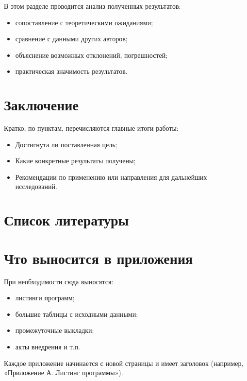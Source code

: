 \documentclass[
  english,
  russian,
  12pt,
  a4paper,
  DIV=11,
  numbers=noendperiod]{scrreprt}
\newcounter{none} %
\providecommand{\tightlist}{%
  \setlength{\itemsep}{0pt}\setlength{\parskip}{0pt}}
\begin{document}
В этом разделе проводится анализ полученных результатов:

\begin{itemize}
\tightlist
\item
  сопоставление с теоретическими ожиданиями;
\item
  сравнение с данными других авторов;
\item
  объяснение возможных отклонений, погрешностей;
\item
  практическая значимость результатов.
\end{itemize}

\chapter{Заключение}\label{ux437ux430ux43aux43bux44eux447ux435ux43dux438ux435}

Кратко, по пунктам, перечисляются главные итоги работы:

\begin{itemize}
\tightlist
\item
  Достигнута ли поставленная цель;
\item
  Какие конкретные результаты получены;
\item
  Рекомендации по применению или направления для дальнейших
  исследований.
\end{itemize}

\chapter*{Список
литературы}\label{ux441ux43fux438ux441ux43eux43a-ux43bux438ux442ux435ux440ux430ux442ux443ux440ux44b}

\printbibliography[heading=none]

\appendix

\chapter{Что выносится в
приложения}\label{ux447ux442ux43e-ux432ux44bux43dux43eux441ux438ux442ux441ux44f-ux432-ux43fux440ux438ux43bux43eux436ux435ux43dux438ux44f}

При необходимости сюда выносятся:

\begin{itemize}
\tightlist
\item
  листинги программ;
\item
  большие таблицы с исходными данными;
\item
  промежуточные выкладки;
\item
  акты внедрения и т.п.
\end{itemize}

Каждое приложение начинается с новой страницы и имеет заголовок
(например, «Приложение А. Листинг программы»).
\end{document}
